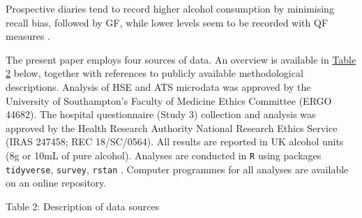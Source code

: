 \documentclass[]{article}
\begin{document}
Prospective diaries tend to record higher alcohol consumption by
minimising recall bias, followed by GF, while lower levels seem to be
recorded with QF measures \citep{Rehm1998, Heeb2005}.

The present paper employs four sources of data. An overview is available
in \protect\hyperlink{table2}{Table 2} below, together with references
to publicly available methodological descriptions. Analysis of HSE and
ATS microdata was approved by the University of Southampton's Faculty of
Medicine Ethics Committee (ERGO 44682). The hospital questionnaire
(Study 3) collection and analysis was approved by the Health Research
Authority National Research Ethics Service (IRAS 247458; REC
18/SC/0564). All results are reported in UK alcohol units (8g or 10mL of
pure alcohol). Analyses are conducted in \texttt{R}
\citep{RCoreTeam2017} using packages \texttt{tidyverse},
\texttt{survey}, \texttt{rstan}
\citep{package-tidyverse, package-rstan, package-survey, Lumley2004}.
Computer programmes for all analyses are available on an online
repository.

Table 2: Description of data sources
\end{document}
